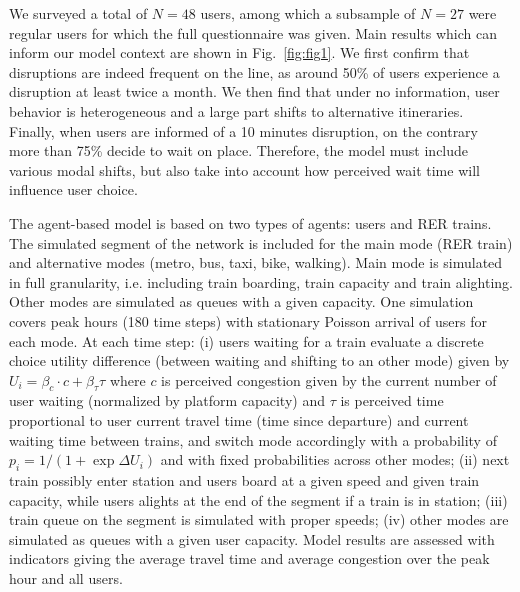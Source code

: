\documentclass[3p,times,procedia]{elsarticle}
\begin{document}
We surveyed a total of $N=48$ users, among which a subsample of $N=27$ were regular users for which the full questionnaire was given. Main results which can inform our model context are shown in Fig.~\ref{fig:fig1}. We first confirm that disruptions are indeed frequent on the line, as around 50\% of users experience a disruption at least twice a month. We then find that under no information, user behavior is heterogeneous and a large part shifts to alternative itineraries. Finally, when users are informed of a 10 minutes disruption, on the contrary more than 75\% decide to wait on place. Therefore, the model must include various modal shifts, but also take into account how perceived wait time will influence user choice.




The agent-based model is based on two types of agents: users and RER trains. The simulated segment of the network is included for the main mode (RER train) and alternative modes (metro, bus, taxi, bike, walking). Main mode is simulated in full granularity, i.e. including train boarding, train capacity and train alighting. Other modes are simulated as queues with a given capacity. One simulation covers peak hours (180 time steps) with stationary Poisson arrival of users for each mode. At each time step: (i) users waiting for a train evaluate a discrete choice utility difference (between waiting and shifting to an other mode) given by $U_i = \beta_c \cdot c + \beta_{\tau} \tau$ where $c$ is perceived congestion given by the current number of user waiting (normalized by platform capacity) and $\tau$ is perceived time proportional to user current travel time (time since departure) and current waiting time between trains, and switch mode accordingly with a probability of $p_i = 1 / (1 + \exp \Delta U_i)$ and with fixed probabilities across other modes; (ii) next train possibly enter station and users board at a given speed and given train capacity, while users alights at the end of the segment if a train is in station; (iii) train queue on the segment is simulated with proper speeds; (iv) other modes are simulated as queues with a given user capacity. Model results are assessed with indicators giving the average travel time and average congestion over the peak hour and all users.
\end{document}

